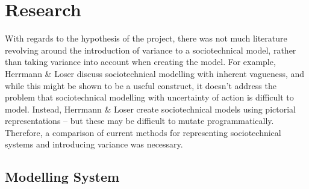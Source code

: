 \chapter{Research}
\label{research_head}
With regards to the hypothesis of the project, there was not much literature revolving around the introduction of variance to a sociotechnical model, rather than taking variance into account when creating the model. For example, Herrmann \& Loser\cite{Herrmann1999} discuss sociotechnical modelling with inherent vagueness, and while this might be shown to be a useful construct, it doesn't address the problem that sociotechnical modelling with uncertainty of action is difficult to model. Instead, Herrmann & Loser create sociotechnical models using pictorial representations -- but these may be difficult to mutate programmatically. Therefore, a comparison of current methods for representing sociotechnical systems and introducing variance was necessary. \par

\section{Modelling System}\label{planning_modelling}
